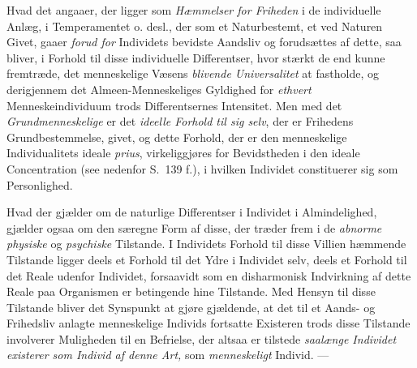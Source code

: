 Hvad det angaaer, der ligger som \emph{Hæmmelser for Friheden} i de individuelle
Anlæg, i Temperamentet o. desl., der som et Naturbestemt, et ved Naturen Givet,
gaaer \emph{forud for} Individets bevidste Aandsliv og forudsættes af dette, saa
bliver, i Forhold til disse individuelle Differentser, hvor stærkt de end kunne
fremtræde, det menneskelige Væsens \emph{blivende Universalitet} at fastholde,
og derigjennem det Almeen-Menneskeliges Gyldighed for \emph{ethvert}
Menneskeindividuum trods Differentsernes Intensitet. Men med det
\emph{Grundmenneskelige} er det \emph{ideelle Forhold til sig selv}, der er
Frihedens Grundbestemmelse, givet, og dette Forhold, der er den menneskelige
Individualitets ideale \textit{prius}, virkeliggjøres for Bevidstheden i den
ideale Concentration (see nedenfor S.\ 139 f.), i hvilken Individet constituerer
sig som Personlighed.

Hvad der gjælder om de naturlige Differentser i Individet i Almindelighed,
gjælder ogsaa om den særegne Form af disse, der træder frem i de \emph{abnorme
physiske} og \emph{psychiske} Tilstande. I Individets Forhold til disse Villien
hæmmende Tilstande ligger deels et Forhold til det Ydre i Individet selv, deels
et Forhold til det Reale udenfor Individet, forsaavidt som en disharmonisk
Indvirkning af dette Reale paa Organismen er betingende hine Tilstande. Med
Hensyn til disse Tilstande bliver det Synspunkt at gjøre gjældende, at det til
et Aands- og Frihedsliv anlagte
 menneskelige Individs fortsatte Existeren trods disse Tilstande involverer
Muligheden til en Befrielse, der altsaa er tilstede \emph{saalænge Individet
existerer som Individ af denne Art,} som \emph{menneskeligt} Individ. ---

